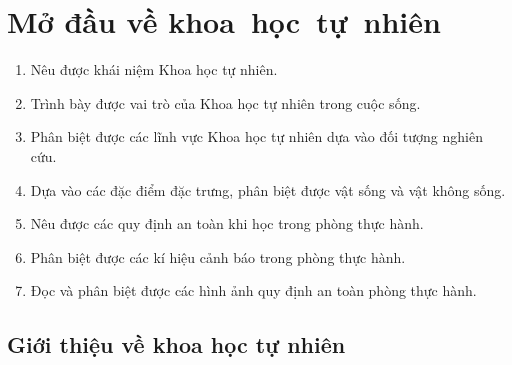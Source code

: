 \documentclass[Main.tex]{subfiles}
\begin{document}
	\gdef\muctieu{%
		\begin{enumerate}
			\item Nêu được khái niệm Khoa học tự nhiên.
			\item Trình bày được vai trò của Khoa học tự nhiên trong cuộc sống.
			\item Phân biệt được các lĩnh vực Khoa học tự nhiên dựa vào đối tượng nghiên cứu.
			\item Dựa vào các đặc điểm đặc trưng, phân biệt được vật sống và vật không sống.
			\item Nêu được các quy định an toàn khi học trong phòng thực hành.
			\item Phân biệt được các kí hiệu cảnh báo trong phòng thực hành.
			\item Đọc và phân biệt được các hình ảnh quy định an toàn phòng thực hành.
		\end{enumerate}
	}%
	\chapter{Mở đầu về khoa~học~tự~nhiên}
	\begin{Muctieu}
		\muctieu
	\end{Muctieu}
	\section{Giới thiệu về khoa học tự nhiên}
\end{document}
